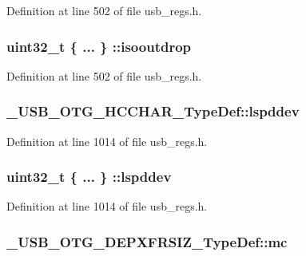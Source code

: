 Definition at line 502 of file usb\-\_\-regs.\-h.

\hypertarget{group___u_s_b___o_t_g___d_r_i_v_e_r_ga3a10515f35890f3351b50d1140ff063e}{
\subsubsection[{isooutdrop}]{\setlength{\rightskip}{0pt plus 5cm}uint32\-\_\-t \{ ... \} \-::isooutdrop}}\label{group___u_s_b___o_t_g___d_r_i_v_e_r_ga3a10515f35890f3351b50d1140ff063e}


Definition at line 502 of file usb\-\_\-regs.\-h.

\hypertarget{group___u_s_b___o_t_g___d_r_i_v_e_r_ga4ee44e963bbcf08680aa896b5f39d7d7}{
\subsubsection[{lspddev}]{ \-\_\-\-U\-S\-B\-\_\-\-O\-T\-G\-\_\-\-H\-C\-C\-H\-A\-R\-\_\-\-Type\-Def\-::lspddev}}\label{group___u_s_b___o_t_g___d_r_i_v_e_r_ga4ee44e963bbcf08680aa896b5f39d7d7}


Definition at line 1014 of file usb\-\_\-regs.\-h.

\hypertarget{group___u_s_b___o_t_g___d_r_i_v_e_r_ga68bfcf547583f040e000f490119b8e1b}{
\subsubsection[{lspddev}]{\setlength{\rightskip}{0pt plus 5cm}uint32\-\_\-t \{ ... \} \-::lspddev}}\label{group___u_s_b___o_t_g___d_r_i_v_e_r_ga68bfcf547583f040e000f490119b8e1b}


Definition at line 1014 of file usb\-\_\-regs.\-h.

\hypertarget{group___u_s_b___o_t_g___d_r_i_v_e_r_ga706f007f2762f307ff5971d15874422c}{
\subsubsection[{mc}]{ \-\_\-\-U\-S\-B\-\_\-\-O\-T\-G\-\_\-\-D\-E\-P\-X\-F\-R\-S\-I\-Z\-\_\-\-Type\-Def\-::mc}}\label{group___u_s_b___o_t_g___d_r_i_v_e_r_ga706f007f2762f307ff5971d15874422c}


